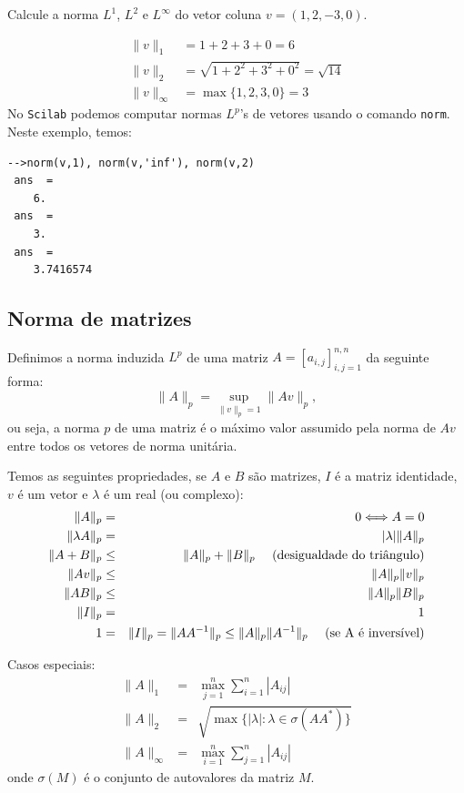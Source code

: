 \begin{ex}
  Calcule a norma $L^1$, $L^2$ e $L^\infty$ do vetor coluna $v = (1, 2, -3, 0)$.
\end{ex}
\begin{sol}
  \begin{align*}
    \|v\|_1 &= 1+2+3+0=6\\
    \|v\|_2 &= \sqrt{1+2^2+3^2+0^2}=\sqrt{14}\\
    \|v\|_\infty &= \max\{1,2,3,0\}=3
  \end{align*}
\ifisscilab
No \verb+Scilab+ podemos computar normas $L^p$'s de vetores usando o comando \verb+norm+. Neste exemplo, temos:
\begin{verbatim}
-->norm(v,1), norm(v,'inf'), norm(v,2)
 ans  =
    6.  
 ans  =
    3.  
 ans  =
    3.7416574  
\end{verbatim}
\fi
\end{sol}


\subsection{Norma de matrizes}

Definimos a norma induzida $L^p$ de uma matriz $A = [a_{i,j}]_{i,j=1}^{n,n}$ da seguinte forma:
\begin{equation*}
  \|A\|_p = \sup_{\|v\|_p=1} \|Av\|_p,
\end{equation*}
ou seja, a norma $p$ de uma matriz é o máximo valor assumido pela norma de $Av$ entre todos os vetores de norma unitária.

Temos as seguintes propriedades, se $A$ e $B$ são matrizes, $I$ é a matriz identidade, $v$ é um vetor e $\lambda$ é um real (ou complexo):
\begin{eqnarray*}
\|A\|_p&=&0 \Longleftrightarrow A=0\\
\|\lambda A\|_p&=&|\lambda| \|A\|_p\\
\|A+B\|_p &\leq & \|A\|_p + \|B\|_p~~~~ (\hbox{desigualdade do triângulo})\\
\|Av\|_p &\leq& \|A\|_p\|v\|_p\\
\|AB\|_p &\leq& \|A\|_p\|B\|_p\\
\|I\|_p&=&1\\
1&=&\|I\|_p=\|AA^{-1}\|_p\leq \|A\|_p\|A^{-1}\|_p~~~~ \hbox{(se A é inversível)}
\end{eqnarray*}

Casos especiais:
\begin{eqnarray*}
\|A\|_1&=& \max_{j=1}^n\sum_{i=1}^n |A_{ij}|\\
\|A\|_2&=& \sqrt{\max\{|\lambda|: \lambda \in \sigma(AA^*)\}}\\
\|A\|_\infty&=& \max_{i=1}^n\sum_{j=1}^n |A_{ij}|
\end{eqnarray*}
onde $\sigma(M)$ é o conjunto de autovalores da matriz $M$.

